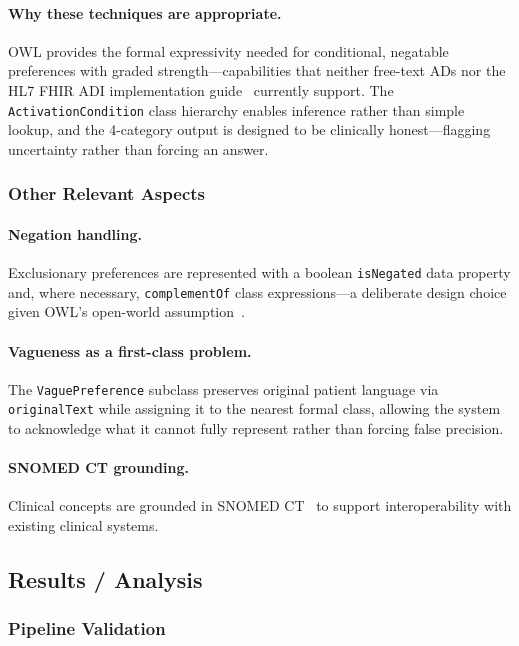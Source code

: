 \documentclass[11pt]{article}
\newcommand{\onto}[1]{\texttt{#1}}
\begin{document}
\paragraph{Why these techniques are appropriate.}
OWL provides the formal expressivity needed for conditional, negatable preferences with graded strength---capabilities that neither free-text ADs nor the HL7 FHIR ADI implementation guide~\cite{hl7adi2024} currently support. The \onto{ActivationCondition} class hierarchy enables inference rather than simple lookup, and the 4-category output is designed to be clinically honest---flagging uncertainty rather than forcing an answer.

\subsubsection{Other Relevant Aspects}

\paragraph{Negation handling.}
Exclusionary preferences are represented with a boolean \onto{isNegated} data property and, where necessary, \onto{complementOf} class expressions---a deliberate design choice given OWL's open-world assumption~\cite{owl2primer}.

\paragraph{Vagueness as a first-class problem.}
The \onto{VaguePreference} subclass preserves original patient language via \onto{originalText} while assigning it to the nearest formal class, allowing the system to acknowledge what it cannot fully represent rather than forcing false precision.

\paragraph{SNOMED CT grounding.}
Clinical concepts are grounded in SNOMED CT~\cite{snomedct} to support interoperability with existing clinical systems.

\subsection{Results / Analysis}

\subsubsection{Pipeline Validation}
\end{document}
